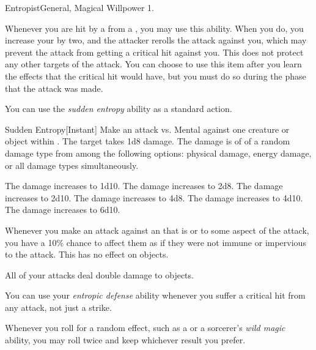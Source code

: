     \begin{feat}{Entropist}{General, Magical}
        \featpre Willpower 1.

         Whenever you are hit by a  from a , you may use this ability.
        When you do, you increase your  by two, and the attacker rerolls the attack against you, which may prevent the attack from getting a critical hit against you.
        This does not protect any other targets of the attack.
        You can choose to use this item after you learn the effects that the critical hit would have, but you must do so during the phase that the attack was made.

         You can use the \textit{sudden entropy} ability as a standard action.
        \begin{instantability}{Sudden Entropy}[Instant]
            \rankline
            Make an attack vs. Mental against one creature or object within \medrange.
            \hit The target takes 1d8 \add {} damage.
            The damage is of of a random damage type from among the following options: physical damage, energy damage, or all damage types simultaneously.

            \rankline
             The damage increases to 1d10.
             The damage increases to 2d8.
             The damage increases to 2d10.
             The damage increases to 4d8.
             The damage increases to 4d10.
             The damage increases to 6d10.
        \end{instantability}

         Whenever you make an attack against an  that is  or  to some aspect of the attack, you have a 10\% chance to affect them as if they were not immune or impervious to the attack.
        This has no effect on objects.

         All of your attacks deal double damage to objects.

         You can use your \textit{entropic defense} ability whenever you suffer a critical hit from any attack, not just a strike.

         Whenever you roll for a random effect, such as a  or a sorcerer's \textit{wild magic} ability, you may roll twice and keep whichever result you prefer.


\end{feat}
